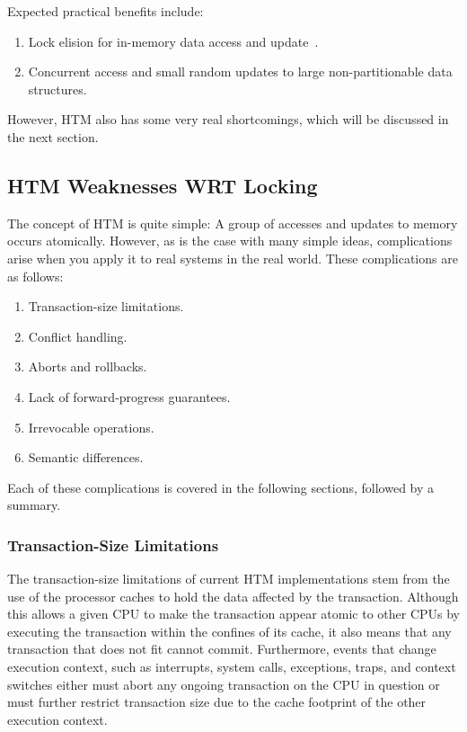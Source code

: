 Expected practical benefits include:

\begin{enumerate}
\item	Lock elision for in-memory data access and
	update~\cite{Martinez01a,Rajwar02a}.
\item	Concurrent access and small random updates to large non-partitionable
	data structures.
\end{enumerate}

However, HTM also has some very real shortcomings, which will be discussed
in the next section.

\subsection{HTM Weaknesses WRT Locking}
\label{sec:future:HTM Weaknesses WRT Locking}

The concept of HTM is quite simple: A group of accesses and updates to
memory occurs atomically.
However, as is the case with many simple ideas, complications arise
when you apply it to real systems in the real world.
These complications are as follows:

\begin{enumerate}
\item	Transaction-size limitations.
\item	Conflict handling.
\item	Aborts and rollbacks.
\item	Lack of forward-progress guarantees.
\item	Irrevocable operations.
\item	Semantic differences.
\end{enumerate}

Each of these complications is covered in the following sections,
followed by a summary.

\subsubsection{Transaction-Size Limitations}
\label{sec:future:Transaction-Size Limitations}

The transaction-size limitations of current HTM implementations
stem from the use of the processor caches to hold the data
affected by the transaction.
Although this allows a given CPU to make the transaction appear atomic to
other CPUs by executing the transaction within the confines of its cache,
it also means that any transaction that does not fit cannot commit.
Furthermore, events that change execution context, such as interrupts,
system calls, exceptions, traps, and context switches either must
abort any ongoing transaction on the CPU in question or must further
restrict transaction size due to the cache footprint of the other
execution context.

